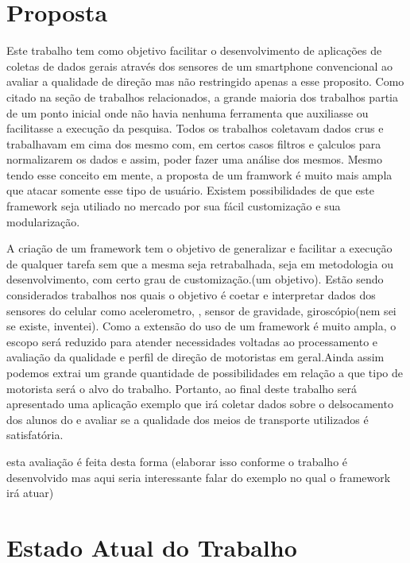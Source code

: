 \documentclass[12pt]{report} %
\begin{document}
\chapter{Proposta} 
\label{sec:proposta}

Este trabalho tem como objetivo facilitar o desenvolvimento de aplicações de coletas de dados gerais através dos sensores de um smartphone convencional ao avaliar a qualidade de direção mas não restringido apenas a esse proposito. Como citado na seção de trabalhos relacionados, a grande maioria dos trabalhos partia de um ponto inicial onde não havia nenhuma ferramenta que auxiliasse ou facilitasse a execução da pesquisa. Todos os trabalhos coletavam dados crus e trabalhavam em cima dos mesmo com, em certos casos filtros e çalculos para normalizarem os dados e assim, poder fazer uma análise dos mesmos. Mesmo tendo esse conceito em mente, a proposta de um framwork é muito mais ampla que atacar somente esse tipo de usuário. Existem possibilidades de que este framework seja utiliado no mercado por sua fácil customização e sua modularização.

A criação de um framework tem o objetivo de generalizar e facilitar a execução de qualquer tarefa sem que a mesma seja retrabalhada, seja em metodologia ou desenvolvimento, com certo grau de customização.(um objetivo). Estão sendo considerados trabalhos nos quais o objetivo é coetar e interpretar dados dos sensores do celular como acelerometro, , sensor de gravidade, giroscópio(nem sei se existe, inventei). Como a extensão do uso de um framework é muito ampla, o escopo será reduzido para atender necessidades voltadas ao processamento e avaliação da qualidade e perfil de direção de motoristas em geral.Ainda assim podemos extrai um grande quantidade de possibilidades em relação a que tipo de motorista será o alvo do trabalho. Portanto, ao final deste trabalho será apresentado uma aplicação exemplo que irá coletar dados sobre o delsocamento dos alunos do  e avaliar se a qualidade dos meios de transporte utilizados é satisfatória. 

esta avaliação é feita desta forma (elaborar isso conforme o trabalho é desenvolvido mas aqui seria interessante falar do  exemplo no qual o framework irá atuar)

\chapter{Estado Atual do Trabalho}
\label{sec:estado_atual}
\end{document}
